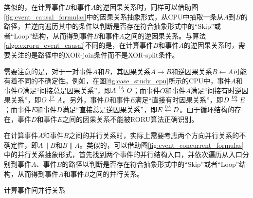 类似的，在计算事件$B$和事件$A$的逆因果关系时，同样可以借助图\ref{fig:event_causal_formulas}中的因果关系抽象形式，从CPU中抽取一条从$A$到$B$的路径，并逆向遍历其中的条件以判断是否存在符合抽象形式中的“Skip”或者“Loop”结构，从而得到事件$B$和事件$A$之间的逆因果关系。与算法\ref{algo:exroru_event_causal}不同的是，在计算事件$B$和事件$A$的逆因果关系时，需要关注的是路径中的XOR-join条件而不是XOR-split条件。


需要注意的是，对于一对事件$A$和$B$，其因果关系$A\rightarrow B$和逆因果关系$B\leftarrow A$可能有着不同的不确定性。例如，在图\ref{fig:case_study_cpu}所示的CPU中，事件$A$和事件$O$满足“间接总是因果关系”，即$A\overset{\text{\tiny{IA}}}{\rightarrow}O$；而事件$O$和事件$A$满足“间接有时逆因果关系”，即$O\overset{\text{\tiny{IS}}}{\leftarrow}A$。另外，事件$D$和事件$E$满足“直接有时因果关系”，即$D\overset{\text{\tiny{DS}}}{\rightarrow}E$；而事件$E$和事件$D$满足“直接总是逆因果关系”，即$E\overset{\text{\tiny{DA}}}{\leftarrow}D$。由于循环结构的存在，事件$D$和事件$E$之间的因果关系不能被RORU算法正确识别。

在计算事件$A$和事件$B$之间的并行关系时，实际上需要考虑两个方向并行关系的不确定性，即$A\parallel B$和$B\parallel A$。类似的，可以借助图\ref{fig:event_concurrent_formulas}中的并行关系抽象形式，首先找到两个事件的并行结构入口，并依次遍历从入口分别到事件$A$、事件$B$的路径以判断是否存在符合抽象形式中的“Skip”或者“Loop”结构，从而得到事件$A$和事件$B$之间的并行关系。

\begin{algorithm}[htbp]
  \LinesNumbered
  \caption{计算事件间并行关系}
  \label{algo:exroru_event_concurrent}
   {
  } 
\end{algorithm}


